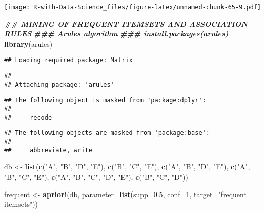 \documentclass[
]{article}
\newenvironment{Shaded}{\begin{snugshade}}{\end{snugshade}}
\newcommand{\AttributeTok}[1]{\textcolor[rgb]{0.13,0.29,0.53}{#1}}
\newcommand{\DecValTok}[1]{\textcolor[rgb]{0.00,0.00,0.81}{#1}}
\newcommand{\DocumentationTok}[1]{\textcolor[rgb]{0.56,0.35,0.01}{\textbf{\textit{#1}}}}
\newcommand{\FloatTok}[1]{\textcolor[rgb]{0.00,0.00,0.81}{#1}}
\newcommand{\FunctionTok}[1]{\textcolor[rgb]{0.13,0.29,0.53}{\textbf{#1}}}
\newcommand{\NormalTok}[1]{#1}
\newcommand{\OtherTok}[1]{\textcolor[rgb]{0.56,0.35,0.01}{#1}}
\newcommand{\StringTok}[1]{\textcolor[rgb]{0.31,0.60,0.02}{#1}}
\begin{document}
\texttt{[image: R-with-Data-Science\_files/figure-latex/unnamed-chunk-65-9.pdf]}

\begin{Shaded}
\begin{Highlighting}[]
\DocumentationTok{\#\# MINING OF FREQUENT ITEMSETS AND ASSOCIATION RULES}
\DocumentationTok{\#\#\# Arules algorithm }
\DocumentationTok{\#\#\# install.packages(\textquotesingle{}arules\textquotesingle{})}
\FunctionTok{library}\NormalTok{(arules)}
\end{Highlighting}
\end{Shaded}

\begin{verbatim}
## Loading required package: Matrix
\end{verbatim}

\begin{verbatim}
## 
## Attaching package: 'arules'
\end{verbatim}

\begin{verbatim}
## The following object is masked from 'package:dplyr':
## 
##     recode
\end{verbatim}

\begin{verbatim}
## The following objects are masked from 'package:base':
## 
##     abbreviate, write
\end{verbatim}

\begin{Shaded}
\begin{Highlighting}[]
\NormalTok{db }\OtherTok{\textless{}{-}} \FunctionTok{list}\NormalTok{(}\FunctionTok{c}\NormalTok{(}\StringTok{"A"}\NormalTok{, }\StringTok{"B"}\NormalTok{, }\StringTok{"D"}\NormalTok{, }\StringTok{"E"}\NormalTok{), }\FunctionTok{c}\NormalTok{(}\StringTok{"B"}\NormalTok{, }\StringTok{"C"}\NormalTok{, }\StringTok{"E"}\NormalTok{), }\FunctionTok{c}\NormalTok{(}\StringTok{"A"}\NormalTok{, }\StringTok{"B"}\NormalTok{, }\StringTok{"D"}\NormalTok{, }\StringTok{"E"}\NormalTok{), }\FunctionTok{c}\NormalTok{(}\StringTok{"A"}\NormalTok{, }\StringTok{"B"}\NormalTok{, }\StringTok{"C"}\NormalTok{, }\StringTok{"E"}\NormalTok{), }\FunctionTok{c}\NormalTok{(}\StringTok{"A"}\NormalTok{, }\StringTok{"B"}\NormalTok{, }\StringTok{"C"}\NormalTok{, }\StringTok{"D"}\NormalTok{, }\StringTok{"E"}\NormalTok{), }\FunctionTok{c}\NormalTok{(}\StringTok{"B"}\NormalTok{, }\StringTok{"C"}\NormalTok{, }\StringTok{"D"}\NormalTok{))}

\NormalTok{frequent }\OtherTok{\textless{}{-}} \FunctionTok{apriori}\NormalTok{(db, }\AttributeTok{parameter=}\FunctionTok{list}\NormalTok{(}\AttributeTok{supp=}\FloatTok{0.5}\NormalTok{, }\AttributeTok{conf=}\DecValTok{1}\NormalTok{, }\AttributeTok{target=}\StringTok{"frequent itemsets"}\NormalTok{))}
\end{Highlighting}
\end{Shaded}
\end{document}

